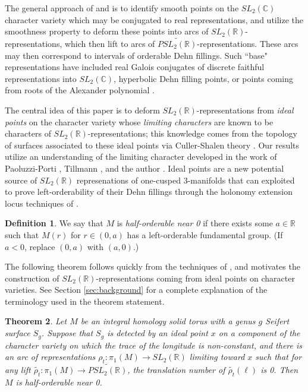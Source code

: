 \documentclass{article}
\theoremstyle{plain}
\newtheorem{theorem}{Theorem}[section]
\theoremstyle{definition}
\newtheorem{definition}[theorem]{Definition}
\theoremstyle{plain}
\theoremstyle{plain}
\theoremstyle{plain}
\theoremstyle{remark}
\theoremstyle{remark}
\theoremstyle{plain}
\theoremstyle{plain}
\begin{document}
\medskip

The general approach of \cite{cullerdunfield} and \cite{gao} is to identify smooth points on the $SL_2(\mathbb{C})$ character variety which may be conjugated to real representations, and utilize the smoothness property to deform these points into arcs of $SL_2(\mathbb{R})$-representations, which then lift to arcs of $\widetilde{PSL_2(\mathbb{R})}$-representations. These arcs may then correspond to intervals of orderable Dehn fillings. Such ``base" representations have included real Galois conjugates of discrete faithful representations into $SL_2(\mathbb{C})$, hyperbolic Dehn filling points, or points coming from roots of the Alexander polynomial \cite{cullerdunfield} \cite{gao}.

\medskip

The central idea of this paper is to deform $SL_2(\mathbb{R})$-representations from \emph{ideal points} on the character variety whose \emph{limiting characters} are known to be characters of $SL_2(\mathbb{R})$-representations; this knowledge comes from the topology of surfaces associated to these ideal points via Culler-Shalen theory \cite{cullershalen}. Our results utilize an understanding of the limiting character developed in the work of Paoluzzi-Porti \cite{paoluzziporti}, Tillmann \cite{tillmann}, and the author \cite{wang}. Ideal points are a new potential source of $SL_2(\mathbb{R})$ represenations of one-cusped 3-manifolds that can exploited to prove left-orderability of their Dehn fillings through the holonomy extension locus techniques of \cite{gao}.

\begin{definition}
We say that $M$ is \emph{half-orderable near 0} if there exists some $a \in \mathbb{R}$ such that $M(r)$ for $r \in (0, a)$ has a left-orderable fundamental group. (If $a < 0$, replace $(0, a)$ with $(a, 0)$.)
\end{definition}

The following theorem follows quickly from the techniques of \cite{gao}, and motivates the construction of $SL_2(\mathbb{R})$-representations coming from ideal points on character varieties. See Section \ref{sec:background} for a complete explanation of the terminology used in the theorem statement.

\begin{theorem}
Let $M$ be an integral homology solid torus with a genus $g$ Seifert surface $S_g$. Suppose that $S_g$ is detected by an ideal point $x$ on a component of the character variety on which the trace of the longitude is non-constant, and there is an arc of representations $\rho_t: \pi_1(M) \to SL_2(\mathbb{R})$ limiting toward $x$ such that for any lift $\widetilde{\rho_t}: \pi_1(M) \to \widetilde{PSL_2(\mathbb{R})}$, the translation number of $\widetilde{\rho_t}(\ell)$ is 0. Then $M$ is half-orderable near 0. 
\end{theorem}
\end{document}
